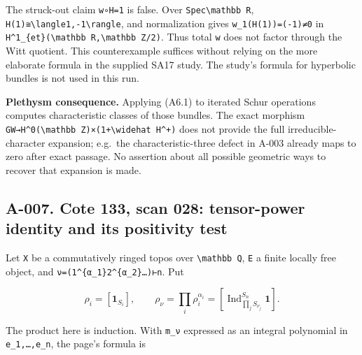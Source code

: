 \documentclass[
  10pt,
]{article}
\begin{document}
The struck-out claim \texttt{\small w∘H=\allowbreak{}1} is false. Over
\texttt{\small Spec\textbackslash{}mathbb R},
\texttt{\small H(\allowbreak{}1)\allowbreak{}≅\textbackslash{}langle1,\allowbreak{}-\allowbreak{}1\textbackslash{}rangle},
and normalization gives
\texttt{\small w\_\allowbreak{}1(\allowbreak{}H(\allowbreak{}1)\allowbreak{})\allowbreak{}=\allowbreak{}(\allowbreak{}-\allowbreak{}1)\allowbreak{}≠0}
in
\texttt{\small H\textasciicircum{}1\_\allowbreak{}\{et\}(\allowbreak{}\textbackslash{}mathbb R,\allowbreak{}\textbackslash{}mathbb Z/\allowbreak{}2)\allowbreak{}}.
Thus total \texttt{\small w} does not factor through the Witt quotient.
This counterexample suffices without relying on the more elaborate
formula in the supplied SA17 study. The study's formula for hyperbolic
bundles is not used in this run.

\textbf{Plethysm consequence.} Applying (A6.1) to iterated Schur
operations computes characteristic classes of those bundles. The exact
morphism
\texttt{\small GW→\allowbreak{}H\textasciicircum{}0(\allowbreak{}\textbackslash{}mathbb Z)\allowbreak{}×(\allowbreak{}1+\allowbreak{}\textbackslash{}widehat H\textasciicircum{}+\allowbreak{})\allowbreak{}}
does not provide the full irreducible-character expansion; e.g.~the
characteristic-three defect in A-003 already maps to zero after exact
passage. No assertion about all possible geometric ways to recover that
expansion is made.

\subsection{A-007. Cote 133, scan 028: tensor-power identity and its
positivity
test}\label{a-007.-cote-133-scan-028-tensor-power-identity-and-its-positivity-test}

Let \texttt{\small X} be a commutatively ringed topos over
\texttt{\small \textbackslash{}mathbb Q}, \texttt{\small E} a finite
locally free object, and
\texttt{\small ν=\allowbreak{}(\allowbreak{}1\textasciicircum{}\{α\_\allowbreak{}1\}2\textasciicircum{}\{α\_\allowbreak{}2\}…)\allowbreak{}⊢n}.
Put

\[
\rho_i=[\mathbf1_{S_i}],\qquad
\rho_\nu=\prod_i\rho_i^{\alpha_i}
=[\operatorname{Ind}_{\prod_jS_{\nu_j}}^{S_n}\mathbf1].
\]

The product here is induction. With \texttt{\small m\_\allowbreak{}ν}
expressed as an integral polynomial in
\texttt{\small e\_\allowbreak{}1,\allowbreak{}…,\allowbreak{}e\_\allowbreak{}n},
the page's formula is
\end{document}

